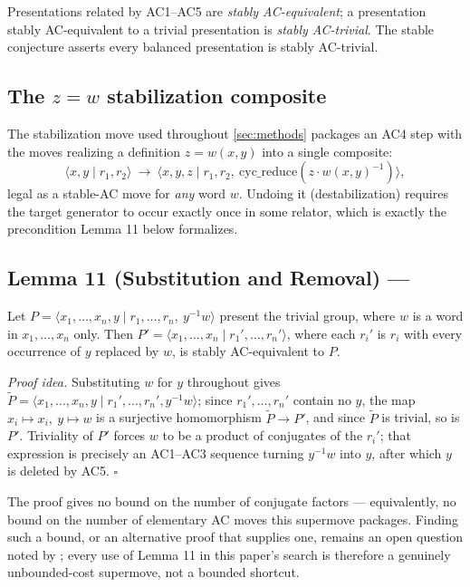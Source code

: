 Presentations related by AC1--AC5 are \emph{stably AC-equivalent}; a presentation stably
AC-equivalent to a trivial presentation is \emph{stably AC-trivial}. The stable conjecture
asserts every balanced presentation is stably AC-trivial.

\subsection{The $z=w$ stabilization composite}

The stabilization move used throughout \ref{sec:methods} packages an AC4 step with the
moves realizing a definition $z=w(x,y)$ into a single composite:
\[
\langle x,y \mid r_1,r_2\rangle \ \longrightarrow\ \langle x,y,z \mid r_1,r_2,\
\mathrm{cyc\_reduce}\!\left(z\cdot w(x,y)^{-1}\right)\rangle,
\]
legal as a stable-AC move for \emph{any} word $w$. Undoing it (destabilization) requires
the target generator to occur exactly once in some relator, which is exactly the
precondition Lemma 11 below formalizes.

\subsection{Lemma 11 (Substitution and Removal) --- \cite{shehper2024hard}}

Let $P=\langle x_1,\dots,x_n,y \mid r_1,\dots,r_n,\ y^{-1}w\rangle$ present the trivial
group, where $w$ is a word in $x_1,\dots,x_n$ only. Then $P'=\langle x_1,\dots,x_n \mid
r_1',\dots,r_n'\rangle$, where each $r_i'$ is $r_i$ with every occurrence of $y$ replaced by
$w$, is stably AC-equivalent to $P$.

\emph{Proof idea.} Substituting $w$ for $y$ throughout gives $\tilde P = \langle
x_1,\dots,x_n,y \mid r_1',\dots,r_n',y^{-1}w\rangle$; since $r_1',\dots,r_n'$ contain no
$y$, the map $x_i\mapsto x_i,\ y\mapsto w$ is a surjective homomorphism $\tilde P\to P'$,
and since $\tilde P$ is trivial, so is $P'$. Triviality of $P'$ forces $w$ to be a product
of conjugates of the $r_i'$; that expression is precisely an AC1--AC3 sequence turning
$y^{-1}w$ into $y$, after which $y$ is deleted by AC5. $\square$

The proof gives no bound on the number of conjugate factors --- equivalently, no bound on the
number of elementary AC moves this supermove packages. Finding such a bound, or an
alternative proof that supplies one, remains an open question noted by
\cite{shehper2024hard}; every use of Lemma 11 in this paper's search is therefore a
genuinely unbounded-cost supermove, not a bounded shortcut.

